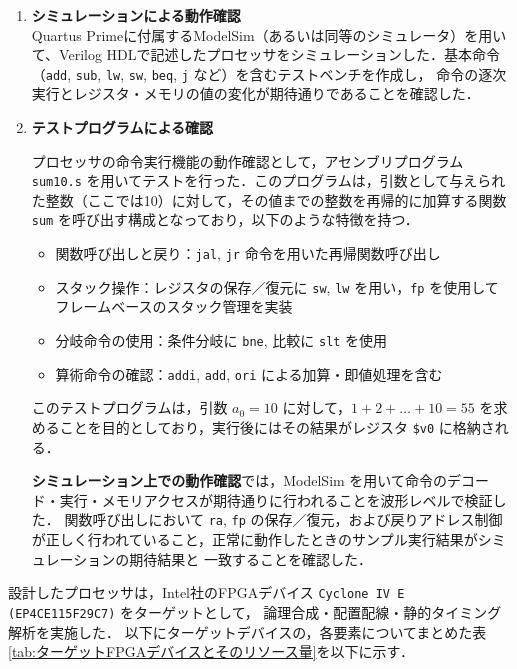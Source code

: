 \documentclass[autodetect-engine,dvi=dvipdfmx,ja=standard,
               a4j,11pt]{bxjsarticle}
\begin{document}
\begin{enumerate}
  \item \textbf{シミュレーションによる動作確認} \\
  Quartus Primeに付属するModelSim（あるいは同等のシミュレータ）を用いて、Verilog HDLで記述したプロセッサをシミュレーションした．基本命令（\texttt{add}, \texttt{sub}, \texttt{lw}, \texttt{sw}, \texttt{beq}, \texttt{j} など）を含むテストベンチを作成し，
  命令の逐次実行とレジスタ・メモリの値の変化が期待通りであることを確認した．
  \item \textbf{テストプログラムによる確認}

プロセッサの命令実行機能の動作確認として，アセンブリプログラム \texttt{sum10.s} を用いてテストを行った．このプログラムは，引数として与えられた整数（ここでは10）に対して，その値までの整数を再帰的に加算する関数 \texttt{sum} を呼び出す構成となっており，以下のような特徴を持つ．

\begin{itemize}
  \item 関数呼び出しと戻り：\texttt{jal}, \texttt{jr} 命令を用いた再帰関数呼び出し
  \item スタック操作：レジスタの保存／復元に \texttt{sw}, \texttt{lw} を用い，\texttt{fp} を使用してフレームベースのスタック管理を実装
  \item 分岐命令の使用：条件分岐に \texttt{bne}, 比較に \texttt{slt} を使用
  \item 算術命令の確認：\texttt{addi}, \texttt{add}, \texttt{ori} による加算・即値処理を含む
\end{itemize}

このテストプログラムは，引数 $a_0 = 10$ に対して，$1 + 2 + \dots + 10 = 55$ を求めることを目的としており，実行後にはその結果がレジスタ \texttt{\$v0} に格納される．

\textbf{シミュレーション上での動作確認}では，ModelSim を用いて命令のデコード・実行・メモリアクセスが期待通りに行われることを波形レベルで検証した．
関数呼び出しにおいて \texttt{ra}, \texttt{fp} の保存／復元，および戻りアドレス制御が正しく行われていること，正常に動作したときのサンプル実行結果がシミュレーションの期待結果と
一致することを確認した．
\end{enumerate}
設計したプロセッサは，Intel社のFPGAデバイス \texttt{Cyclone IV E (EP4CE115F29C7)} をターゲットとして，
論理合成・配置配線・静的タイミング解析を実施した．
以下にターゲットデバイスの，各要素についてまとめた表\ref{tab:ターゲットFPGAデバイスとそのリソース量}を以下に示す．\\
\end{document}
